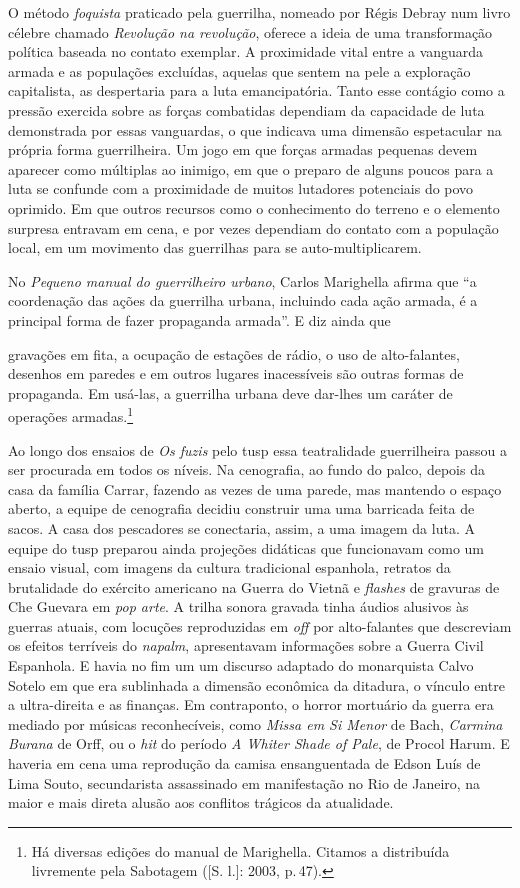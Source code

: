 O método {\it foquista} praticado pela guerrilha, nomeado por Régis
Debray num livro célebre chamado {\it Revolução na revolução}, oferece a
ideia de uma transformação política baseada no contato exemplar. A
proximidade vital entre a vanguarda armada e as populações excluídas,
aquelas que sentem na pele a exploração capitalista, as despertaria para
a luta emancipatória. Tanto esse contágio como a pressão exercida sobre
as forças combatidas dependiam da capacidade de luta demonstrada por
essas vanguardas, o que indicava uma dimensão espetacular na própria
forma guerrilheira. Um jogo em que forças armadas pequenas devem
aparecer como múltiplas ao inimigo, em que o preparo de alguns poucos
para a luta se confunde com a proximidade de muitos lutadores potenciais
do povo oprimido. Em que outros recursos como o conhecimento do terreno
e o elemento surpresa entravam em cena, e por vezes dependiam do contato
com a população local, em um movimento das guerrilhas para se
auto-multiplicarem.

No {\it Pequeno manual do guerrilheiro urbano}, Carlos Marighella afirma
que “a coordenação das ações da guerrilha urbana, incluindo cada ação
armada, é a principal forma de fazer propaganda armada”. E diz ainda que

\startblockquote
gravações em fita, a ocupação de estações de rádio, o uso de
alto-falantes, desenhos em paredes e em outros lugares inacessíveis são
outras formas de propaganda. Em usá-las, a guerrilha urbana deve
dar-lhes um caráter de operações armadas.\footnote{Há diversas edições
  do manual de Marighella. Citamos a distribuída livremente pela
  Sabotagem ({[}S. l.{]}: 2003, p.\,47).}
\stopblockquote

Ao longo dos ensaios de {\it Os fuzis} pelo {\sc tusp} essa teatralidade
guerrilheira passou a ser procurada em todos os níveis. Na cenografia,
ao fundo do palco, depois da casa da família Carrar, fazendo as vezes de
uma parede, mas mantendo o espaço aberto, a equipe de cenografia decidiu
construir uma uma barricada feita de sacos. A casa dos pescadores se
conectaria, assim, a uma imagem da luta. A equipe do {\sc tusp} preparou ainda
projeções didáticas que funcionavam como um ensaio visual, com imagens
da cultura tradicional espanhola, retratos da brutalidade do exército
americano na Guerra do Vietnã e {\it flashes} de gravuras de Che Guevara
em {\it pop arte}. A trilha sonora gravada tinha áudios alusivos às
guerras atuais, com locuções reproduzidas em {\it off} por alto-falantes
que descreviam os efeitos terríveis do {\it napalm}, apresentavam
informações sobre a Guerra Civil Espanhola. E havia no fim um um
discurso adaptado do monarquista Calvo Sotelo em que era sublinhada a
dimensão econômica da ditadura, o vínculo entre a ultra-direita e as
finanças. Em contraponto, o horror mortuário da guerra era mediado por
músicas reconhecíveis, como {\it Missa em Si Menor} de Bach,
{\it Carmina Burana} de Orff, ou o {\it hit} do período {\it A Whiter
Shade of Pale}, de Procol Harum. E haveria em cena uma reprodução da
camisa ensanguentada de Edson Luís de Lima Souto, secundarista
assassinado em manifestação no Rio de Janeiro, na maior e mais direta
alusão aos conflitos trágicos da atualidade.

